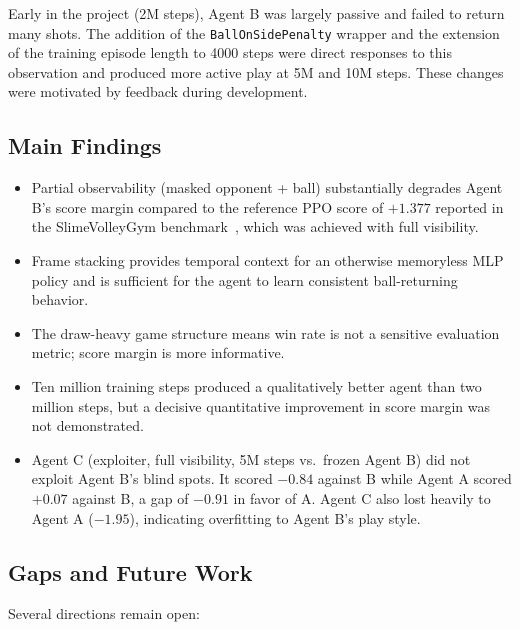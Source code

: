 \documentclass[conference]{IEEEtran}
\begin{document}
Early in the project (2M steps), Agent B was largely passive and failed to return many shots. The addition of the \texttt{BallOnSidePenalty} wrapper and the extension of the training episode length to 4000 steps were direct responses to this observation and produced more active play at 5M and 10M steps. These changes were motivated by feedback during development.

\subsection{Main Findings}

\begin{itemize}
    \item Partial observability (masked opponent + ball) substantially degrades Agent B's score margin compared to the reference PPO score of $+1.377$ reported in the SlimeVolleyGym benchmark~\cite{slimevolleygym}, which was achieved with full visibility.
    \item Frame stacking provides temporal context for an otherwise memoryless MLP policy and is sufficient for the agent to learn consistent ball-returning behavior.
    \item The draw-heavy game structure means win rate is not a sensitive evaluation metric; score margin is more informative.
    \item Ten million training steps produced a qualitatively better agent than two million steps, but a decisive quantitative improvement in score margin was not demonstrated.
    \item Agent C (exploiter, full visibility, 5M steps vs.\ frozen Agent B) did not exploit Agent B's blind spots. It scored $-0.84$ against B while Agent A scored $+0.07$ against B, a gap of $-0.91$ in favor of A. Agent C also lost heavily to Agent A ($-1.95$), indicating overfitting to Agent B's play style.
\end{itemize}

\subsection{Gaps and Future Work}

Several directions remain open:
\end{document}
